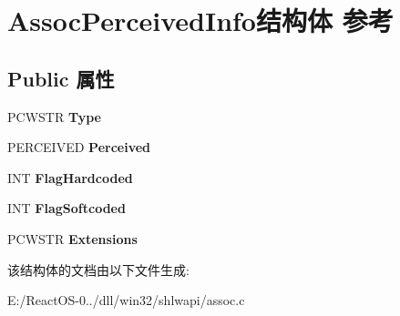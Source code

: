 \hypertarget{struct_assoc_perceived_info}{}\section{Assoc\+Perceived\+Info结构体 参考}
\label{struct_assoc_perceived_info}
\subsection*{Public 属性}
\begin{DoxyCompactItemize}
\item 
\mbox{\label{struct_assoc_perceived_info_ae8240ce74e240071e6cd5314c13c5c01}} 
P\+C\+W\+S\+TR {\bfseries Type}
\item 
\mbox{\label{struct_assoc_perceived_info_a3cd825789472574790c15fef0a605ea0}} 
P\+E\+R\+C\+E\+I\+V\+ED {\bfseries Perceived}
\item 
\mbox{\label{struct_assoc_perceived_info_ae630f97a528387103c1bbc9c278c5529}} 
I\+NT {\bfseries Flag\+Hardcoded}
\item 
\mbox{\label{struct_assoc_perceived_info_a24d28bc1191e12d4b8157c03fec8141b}} 
I\+NT {\bfseries Flag\+Softcoded}
\item 
\mbox{\label{struct_assoc_perceived_info_acf2a0ad691a08ee627d47b40b5e4b363}} 
P\+C\+W\+S\+TR {\bfseries Extensions}
\end{DoxyCompactItemize}


该结构体的文档由以下文件生成\+:\begin{DoxyCompactItemize}
\item 
E\+:/\+React\+O\+S-\/0../dll/win32/shlwapi/assoc.\+c\end{DoxyCompactItemize}
